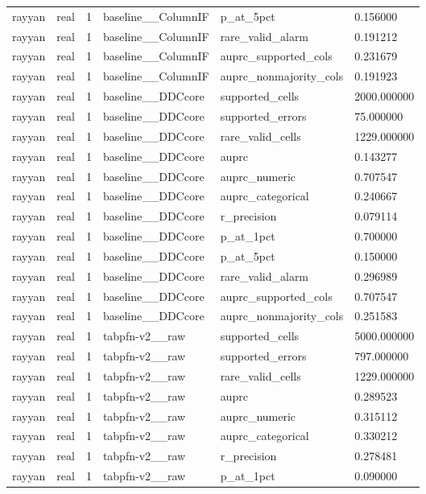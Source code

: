 \begin{tabular}{llllll}
rayyan & real & 1 & baseline\_\_ColumnIF & p\_at\_5pct & 0.156000 \\
rayyan & real & 1 & baseline\_\_ColumnIF & rare\_valid\_alarm & 0.191212 \\
rayyan & real & 1 & baseline\_\_ColumnIF & auprc\_supported\_cols & 0.231679 \\
rayyan & real & 1 & baseline\_\_ColumnIF & auprc\_nonmajority\_cols & 0.191923 \\
rayyan & real & 1 & baseline\_\_DDCcore & supported\_cells & 2000.000000 \\
rayyan & real & 1 & baseline\_\_DDCcore & supported\_errors & 75.000000 \\
rayyan & real & 1 & baseline\_\_DDCcore & rare\_valid\_cells & 1229.000000 \\
rayyan & real & 1 & baseline\_\_DDCcore & auprc & 0.143277 \\
rayyan & real & 1 & baseline\_\_DDCcore & auprc\_numeric & 0.707547 \\
rayyan & real & 1 & baseline\_\_DDCcore & auprc\_categorical & 0.240667 \\
rayyan & real & 1 & baseline\_\_DDCcore & r\_precision & 0.079114 \\
rayyan & real & 1 & baseline\_\_DDCcore & p\_at\_1pct & 0.700000 \\
rayyan & real & 1 & baseline\_\_DDCcore & p\_at\_5pct & 0.150000 \\
rayyan & real & 1 & baseline\_\_DDCcore & rare\_valid\_alarm & 0.296989 \\
rayyan & real & 1 & baseline\_\_DDCcore & auprc\_supported\_cols & 0.707547 \\
rayyan & real & 1 & baseline\_\_DDCcore & auprc\_nonmajority\_cols & 0.251583 \\
rayyan & real & 1 & tabpfn-v2\_\_raw & supported\_cells & 5000.000000 \\
rayyan & real & 1 & tabpfn-v2\_\_raw & supported\_errors & 797.000000 \\
rayyan & real & 1 & tabpfn-v2\_\_raw & rare\_valid\_cells & 1229.000000 \\
rayyan & real & 1 & tabpfn-v2\_\_raw & auprc & 0.289523 \\
rayyan & real & 1 & tabpfn-v2\_\_raw & auprc\_numeric & 0.315112 \\
rayyan & real & 1 & tabpfn-v2\_\_raw & auprc\_categorical & 0.330212 \\
rayyan & real & 1 & tabpfn-v2\_\_raw & r\_precision & 0.278481 \\
rayyan & real & 1 & tabpfn-v2\_\_raw & p\_at\_1pct & 0.090000 \\

\end{tabular}
